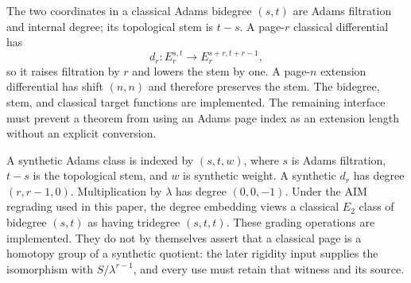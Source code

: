 \begin{definition}
  \label{def:adams-bidegree}
  \notready
  The two coordinates in a classical Adams bidegree $(s,t)$ are Adams
  filtration and internal degree; its topological stem is $t-s$.  A
  page-$r$ classical differential has
  \[
    d_r:E_r^{s,t}\longrightarrow E_r^{s+r,t+r-1},
  \]
  so it raises filtration by $r$ and lowers the stem by one.  A page-$n$
  extension differential has shift $(n,n)$ and therefore preserves the stem.
  The bidegree, stem, and classical target functions are implemented.  The
  remaining interface must prevent a theorem from using an Adams page index
  as an extension length without an explicit conversion.
\end{definition}

\begin{definition}
  \label{def:synthetic-tridegree}
  \notready
  A synthetic Adams class is indexed by $(s,t,w)$, where $s$ is Adams
  filtration, $t-s$ is the topological stem, and $w$ is synthetic weight.  A
  synthetic $d_r$ has degree $(r,r-1,0)$.  Multiplication by $\lambda$ has
  degree $(0,0,-1)$.  Under the AIM regrading used in this paper, the degree
  embedding views a classical $E_2$ class of bidegree $(s,t)$ as having
  tridegree $(s,t,t)$.  These grading operations are implemented.  They do
  not by themselves assert that a classical page is a homotopy group of a
  synthetic quotient: the later rigidity input supplies the isomorphism with
  $S/\lambda^{r-1}$, and every use must retain that witness and its source.
\end{definition}

